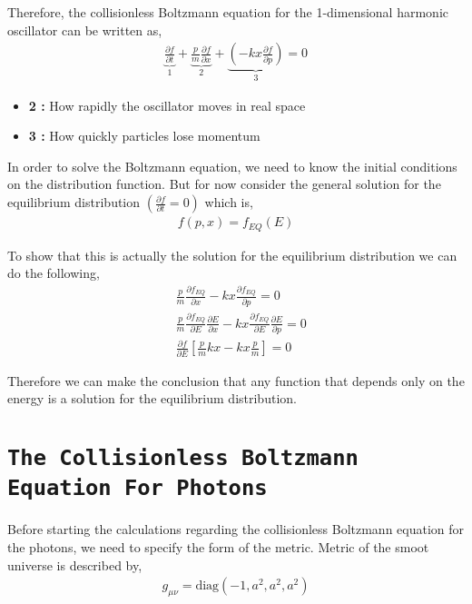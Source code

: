 Therefore, the collisionless Boltzmann equation for the 1-dimensional harmonic oscillator can be written as,
\begin{align}
\underbrace{\frac{\partial f}{\partial t}}_{1} + \underbrace{\frac{p}{m}\frac{\partial f}{\partial x}}_{2} + \underbrace{\left(-kx\frac{\partial f}{\partial p}\right)}_{3} = 0
\end{align}

\begin{itemize}
\item \textbf{2 : } How rapidly the oscillator moves in real space
\item \textbf{3 : } How quickly particles lose momentum
\end{itemize}

In order to solve the Boltzmann equation, we need to know the initial conditions on the distribution function. But for now consider the general solution for the  equilibrium distribution $\left(\frac{\partial f}{\partial t} = 0\right)$ which is,
\begin{align}
f\left(p,x\right) = f_{EQ}\left(E\right)
\end{align}

To show that this is actually the solution for the equilibrium distribution we can do the following,
\begin{align}
&\frac{p}{m}\frac{\partial f_{EQ}}{\partial x} -kx\frac{\partial f_{EQ}}{\partial p} = 0\\
&\frac{p}{m}\frac{\partial f_{EQ}}{\partial E}\frac{\partial E}{\partial x} -kx\frac{\partial f_{EQ}}{\partial E}\frac{\partial E}{\partial p} = 0\\
&\frac{\partial f}{\partial E}\left[\frac{p}{m}kx - kx\frac{p}{m}\right] = 0
\end{align}

Therefore we can make the conclusion that any function that depends only on the energy is a solution for the equilibrium distribution.


\section{\texttt{The Collisionless Boltzmann Equation For Photons}}
Before starting the calculations regarding the collisionless Boltzmann equation for the photons, we need to specify the form of the metric. Metric of the smoot universe is described by,
\begin{align}
g_{\mu\nu} = \text{diag}\left(-1,a^{2},a^{2},a^{2}\right)
\end{align}

